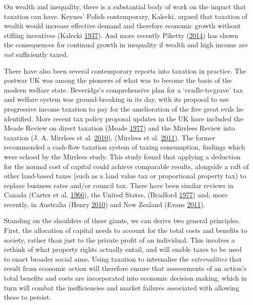 \documentclass[]{tufte-handout}
\begin{document}
On wealth and inequality, there is a substantial body of work on the
impact that taxation can have. Keynes' Polish contemporary, Kalecki,
argued that taxation of wealth would increase effective demand and
therefore economic growth without stifling incentives (Kalecki
\protect\hyperlink{ref-Kalecki1937}{1937}). And more recently Piketty
(\protect\hyperlink{ref-Piketty2014a}{2014}) has shown the consequences
for continual growth in inequality if wealth and high income are
\emph{not} sufficiently taxed.

There have also been several contemporary reports into taxation in
practice. The postwar UK was among the pioneers of what was to become
the basis of the modern welfare state. Beveridge's comprehensive plan
for a `cradle-to-grave' tax and welfare system was ground-breaking in
its day, with its proposal to use progressive income taxation to pay for
the amelioration of the five great evils he identified. More recent tax
policy proposal updates in the UK have included the Meade Review on
direct taxation (Meade \protect\hyperlink{ref-Meade1977}{1977}) and the
Mirrlees Review into taxation (J. A. Mirrlees et al.
\protect\hyperlink{ref-Mirrlees2010d}{2010}), (Mirrlees et al.
\protect\hyperlink{ref-Mirrlees2011}{2011}). The former recommended a
cash-flow taxation system of taxing consumption, findings which were
echoed by the Mirrlees study. This study found that applying a deduction
for the normal cost of capital could achieve comparable results,
alongside a raft of other land-based taxes (such as a land value tax or
proportional property tax) to replace business rates and/or council tax.
There have been similar reviews in Canada (Carter et al.
\protect\hyperlink{ref-Carter1966}{1966}), the United States, (Bradford
\protect\hyperlink{ref-Bradford1977}{1977}) and, more recently, in
Australia (Henry \protect\hyperlink{ref-Henry2010}{2010}) and New
Zealand (Evans \protect\hyperlink{ref-evans2011reflections}{2011}).

Standing on the shoulders of these giants, we can derive two general
principles. First, the allocation of capital needs to account for the
total costs and benefits to society, rather than just to the private
profit of an individual. This involves a rethink of what property rights
actually entail, and will enable taxes to be used to enact broader
social aims. Using taxation to internalise the \emph{externalities} that
result from economic action will therefore ensure that assessements of
an action's total benefits and costs are incorporated into economic
decision making, which in turn will combat the inefficiencies and market
failures associated with allowing these to persist.
\end{document}
